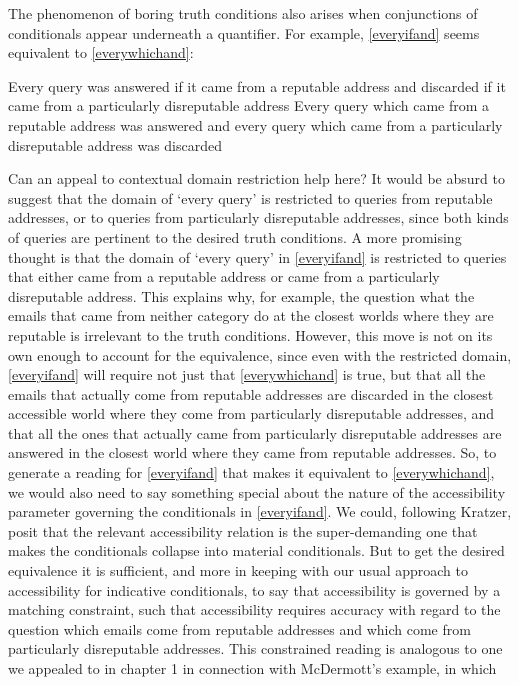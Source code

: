 \documentclass[If.tex]{subfiles}
\begin{document}
The phenomenon of boring truth conditions also arises when conjunctions of conditionals appear underneath a quantifier.  For example, \ref{everyifand} seems equivalent to \ref{everywhichand}:
\begin{prop}
	\nitem \label{everyifand}
	Every query was answered if it came from a reputable address and discarded if it came from a particularly disreputable address
	\nitem \label{everywhichand}
	Every query which came from a reputable address was answered and every query which came from a particularly disreputable address was discarded
\end{prop}
Can an appeal to contextual domain restriction help here?   It would be absurd to suggest that the domain of ‘every query’ is restricted to queries from reputable addresses, or to queries from particularly disreputable addresses, since both kinds of queries are pertinent to the desired truth conditions.  A more promising thought is that the domain of ‘every query’ in \ref{everyifand} is restricted to queries that either came from a reputable address or came from a particularly disreputable address.  This explains why, for example, the question what the emails that came from neither category do at the closest worlds where they are reputable is irrelevant to the truth conditions.  However, this move is not on its own enough to account for the equivalence, since even with the restricted domain, \ref{everyifand} will require not just that \ref{everywhichand} is true, but that all the emails that actually come from reputable addresses are discarded in the closest accessible world where they come from particularly disreputable addresses, and that all the ones that actually came from particularly disreputable addresses are answered in the closest world where they came from reputable addresses.  So, to generate a reading for \ref{everyifand} that makes it equivalent to \ref{everywhichand}, we would also need to say something special about the nature of the accessibility parameter governing the conditionals in \ref{everyifand}.  We could, following Kratzer, posit that the relevant accessibility relation is the super-demanding one that makes the conditionals collapse into material conditionals.  But to get the desired equivalence it is sufficient, and more in keeping with our usual approach to accessibility for indicative conditionals, to say that accessibility is governed by a matching constraint, such that accessibility requires accuracy with regard to the question which emails come from reputable addresses and which come from particularly disreputable addresses.  This constrained reading is analogous to one we appealed to in chapter 1 in connection with McDermott's example, in which 
\end{document}
